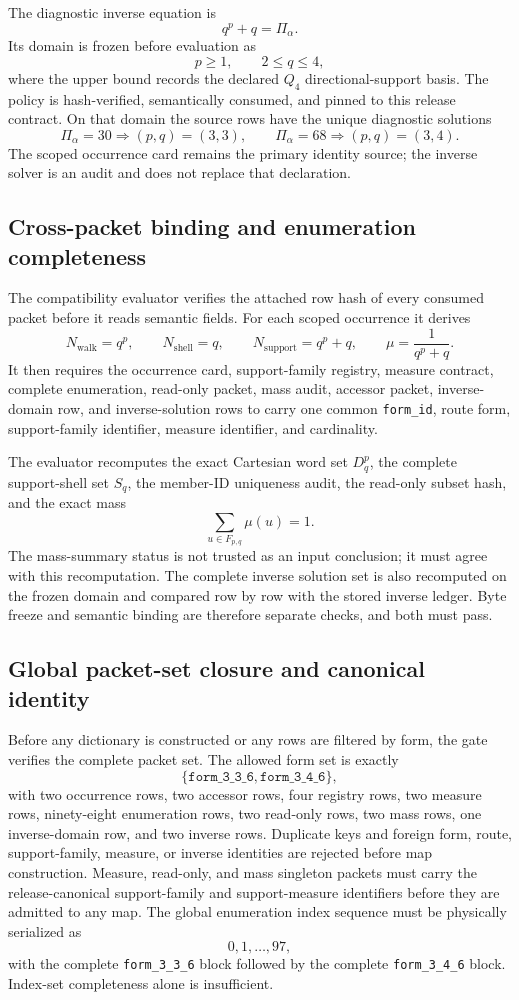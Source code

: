 The diagnostic inverse equation is
\[
q^p+q=\Pi_\alpha.
\]
Its domain is frozen before evaluation as
\[
p\ge 1,
\qquad
2\le q\le 4,
\]
where the upper bound records the declared \(Q_4\) directional-support basis.
The policy is hash-verified, semantically consumed, and pinned to this release
contract.  On that domain the source rows have the unique diagnostic solutions
\[
\Pi_\alpha=30\Rightarrow(p,q)=(3,3),
\qquad
\Pi_\alpha=68\Rightarrow(p,q)=(3,4).
\]
The scoped occurrence card remains the primary identity source; the inverse
solver is an audit and does not replace that declaration.

\subsection{Cross-packet binding and enumeration completeness}

The compatibility evaluator verifies the attached row hash of every consumed
packet before it reads semantic fields.  For each scoped occurrence it derives
\[
N_{\mathrm{walk}}=q^p,
\qquad
N_{\mathrm{shell}}=q,
\qquad
N_{\mathrm{support}}=q^p+q,
\qquad
\mu=\frac{1}{q^p+q}.
\]
It then requires the occurrence card, support-family registry, measure
contract, complete enumeration, read-only packet, mass audit, accessor packet,
inverse-domain row, and inverse-solution rows to carry one common
\texttt{form\_id}, route form, support-family identifier, measure identifier,
and cardinality.

The evaluator recomputes the exact Cartesian word set \(D_q^p\), the complete
support-shell set \(S_q\), the member-ID uniqueness audit, the read-only subset
hash, and the exact mass
\[
\sum_{u\in F_{p,q}}\mu(u)=1.
\]
The mass-summary status is not trusted as an input conclusion; it must agree
with this recomputation.  The complete inverse solution set is also recomputed
on the frozen domain and compared row by row with the stored inverse ledger.
Byte freeze and semantic binding are therefore separate checks, and both must
pass.

\subsection{Global packet-set closure and canonical identity}

Before any dictionary is constructed or any rows are filtered by form, the
gate verifies the complete packet set.  The allowed form set is exactly
\[
\{\texttt{form\_3\_3\_6},\texttt{form\_3\_4\_6}\},
\]
with two occurrence rows, two accessor rows, four registry rows, two measure
rows, ninety-eight enumeration rows, two read-only rows, two mass rows, one
inverse-domain row, and two inverse rows.  Duplicate keys and foreign form,
route, support-family, measure, or inverse identities are rejected before
map construction.  Measure, read-only, and mass singleton packets must carry
the release-canonical support-family and support-measure identifiers before
they are admitted to any map.  The global enumeration index sequence must be
physically serialized as
\[
0,1,\ldots,97,
\]
with the complete \texttt{form\_3\_3\_6} block followed by the complete
\texttt{form\_3\_4\_6} block.  Index-set completeness alone is insufficient.

